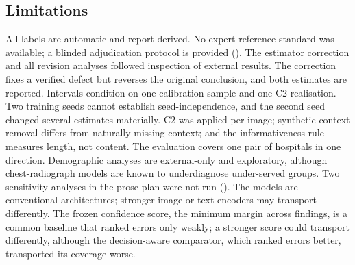 \subsection*{Limitations}
All labels are automatic and report-derived. No expert reference standard was
available; a blinded adjudication protocol is provided (). The
estimator correction and all revision analyses followed inspection of external
results. The correction fixes a verified defect but reverses the original conclusion, and both estimates are reported. Intervals condition on one
calibration sample and one C2 realisation. Two training seeds cannot establish
seed-independence, and the second seed changed several estimates materially.
C2 was applied per image; synthetic context removal differs from naturally
missing context; and the informativeness rule measures length, not content.
The evaluation covers one pair of hospitals in one direction. Demographic
analyses are external-only and exploratory, although chest-radiograph models
are known to underdiagnose under-served groups.\cite{seyyed2021} Two sensitivity analyses in the
prose plan were not run (). The models are conventional
architectures; stronger image or text encoders may transport differently. The
frozen confidence score, the minimum margin across findings, is a common
baseline that ranked errors only weakly; a stronger score could transport
differently, although the decision-aware comparator, which ranked errors
better, transported its coverage worse.

